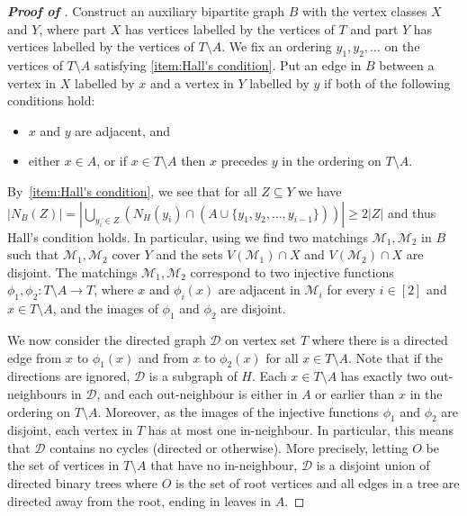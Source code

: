 \documentclass[10pt,a4paper,reqno]{amsart}
\begin{document}
\begin{proof}[\textbf{Proof of }]
Construct an auxiliary bipartite graph $B$ with the vertex classes $X$ and $Y$, where part $X$ has vertices labelled by the vertices of $T$ and part $Y$ has vertices labelled by the vertices of $T\setminus A$. We fix an ordering $y_1,y_2,\ldots $ on the vertices of $T \setminus A$ satisfying \ref{item:Hall's condition}. Put an edge in $B$ between a vertex in $X$ labelled by $x$ and a vertex in $Y$ labelled by $y$ if both of the following conditions hold:
\begin{itemize}
    \item $x$ and $y$ are adjacent, and
    \item either $x \in A$, or if $x \in T \setminus A$ then $x$ precedes $y$ in the ordering on $T \setminus A$.
\end{itemize}
By~\ref{item:Hall's condition}, we see that for all $Z \subseteq Y$ we have $|N_B(Z)| = |\bigcup_{y_i \in Z} (N_H(y_i) \cap (A \cup \{y_1,y_2,\ldots,y_{i-1}\}))| \ge 2|Z|$ and thus Hall's condition holds. In particular, using  we find two matchings $\mathcal{M}_1, \mathcal{M}_2$ in $B$ such that $\mathcal{M}_1, \mathcal{M}_2$ cover $Y$ and the sets $V(\mathcal{M}_1)\cap X$ and $V(\mathcal{M}_2)\cap X$ are disjoint. The matchings $\mathcal{M}_1, \mathcal{M}_2$ correspond to two injective functions $\phi_1, \phi_2: T\setminus A \rightarrow T$, where $x$ and $\phi_i(x)$ are adjacent in $\mathcal{M}_i$ for every $i\in [2]$ and $x\in T\setminus A$, and the images of $\phi_1$ and $\phi_2$ are disjoint.

We now consider the directed graph $\mathcal{D}$ on vertex set $T$ where there is a directed edge from $x$ to $\phi_1(x)$ and from  $x$ to $\phi_2(x)$ for all $x \in T \setminus A$. Note that if the directions are ignored, $\mathcal{D}$ is a subgraph of $H$. Each $x \in T\setminus A$ has exactly two out-neighbours in $\mathcal{D}$, and each out-neighbour is either in $A$ or earlier than $x$ in the ordering on $T \setminus A$. Moreover, as the images of the injective functions $\phi_1$ and $\phi_2$ are disjoint, each vertex in $T$ has at most one in-neighbour. In particular, this means that $\mathcal{D}$ contains no cycles (directed or otherwise). More precisely, letting $O$ be the set of vertices in $T \setminus A$ that have no in-neighbour, $\mathcal{D}$ is a disjoint union of directed binary trees where $O$ is the set of root vertices and all edges in a tree are directed away from the root, ending in leaves in $A$.


\end{proof}
\end{document}
